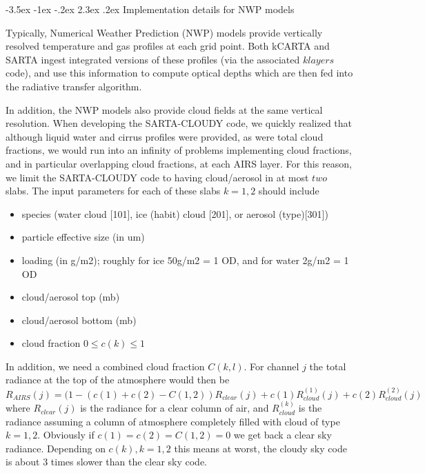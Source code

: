 \documentclass[11pt]{article}
\makeatletter
\newcommand{\kc}{\textsf{kCARTA}\xspace}
\newcommand{\sa}{\textsf{SARTA}\xspace}
\newcommand{\sasc}{\textsf{SARTA-CLOUDY}\xspace}
\renewcommand{\section}{\@startsection {section}{1}{\z@}%
                                   {-3.5ex \@plus -1ex \@minus -.2ex}%
                                   {2.3ex \@plus.2ex}%
                                   {\reset@font\large\bfseries}}
\makeatother
\begin{document}
\section{Implementation details for NWP models}

Typically, Numerical Weather Prediction (NWP) models provide vertically resolved temperature and gas profiles at each 
grid point. Both \kc and \sa ingest integrated versions of these profiles (via the associated $klayers$ code), and use 
this information to compute optical depths which are then fed into the radiative transfer algorithm.

In addition, the NWP models also provide cloud fields at the same vertical resolution. When developing the \sasc code, we
quickly realized that although liquid water and cirrus profiles were provided, as were total cloud fractions, we would 
run into an infinity of problems implementing cloud fractions, and in particular overlapping cloud fractions, at each 
AIRS layer. For this reason, we limit the \sasc code to having cloud/aerosol in at most $two$ slabs. The input parameters
for each of these slabs $k=1,2$ 
 should include
\begin{itemize}
\item species (water cloud [101], ice (habit) cloud [201], or aerosol (type)[301])
\item particle effective size (in um)
\item loading (in g/m2); roughly for ice 50g/m2 = 1 OD, and for water 2g/m2 = 1 OD
\item cloud/aerosol top (mb)
\item cloud/aerosol bottom (mb)
\item cloud fraction $0 \le c(k) \le 1$
\end{itemize}

In addition, we need a combined cloud fraction $C(k,l)$. For channel $j$ the total radiance at the top of the atmosphere 
would then be
\[
R_{AIRS}(j) = (1 -  (c(1) + c(2) - C(1,2)) R_{clear}(j) + c(1) R^{(1)}_{cloud}(j) + c(2) R^{(2)}_{cloud}(j)
\]
where $R_{clear}(j)$ is the radiance for a clear column of air, and $R^{(k)}_{cloud}$ is the radiance assuming 
a column of atmosphere completely filled with cloud of type $k=1,2$. Obviously if $c(1) = c(2) = C(1,2) = 0$ we get 
back a clear sky radiance. Depending on $c(k),k=1,2$ this means at worst, the cloudy sky code is about 3 times 
slower than the clear sky code.

\end{document}
